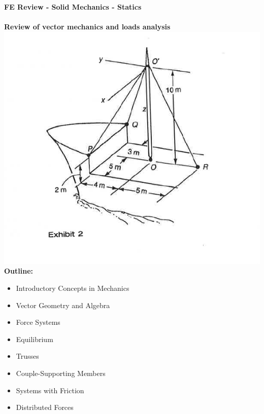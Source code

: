 \documentclass[11pt]{article}
\begin{document}
\textbf{ \LARGE FE Review - Solid Mechanics - Statics} \\\\
\textbf{ \LARGE Review of vector mechanics and loads analysis } \\

\LARGE
		\includegraphics[scale=.5]{lecture1_fig1.png}\\
		\textbf{Outline:}\\
		
		\begin{itemize}
			\item Introductory Concepts in Mechanics
			\item Vector Geometry and Algebra
			\item Force Systems
			\item Equilibrium
			\item Trusses
			\item Couple-Supporting Members
			\item Systems with Friction
			\item Distributed Forces
		\end{itemize}
\end{document}

